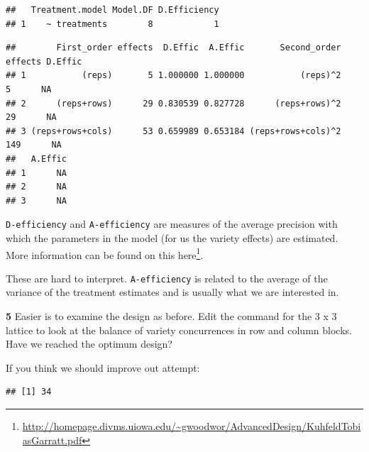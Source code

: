 \documentclass[
]{book}
\makeatletter
\newenvironment{Shaded}{\begin{snugshade}}{\end{snugshade}}
\newcommand{\FloatTok}[1]{\textcolor[rgb]{0.00,0.00,0.81}{#1}}
\newcommand{\NormalTok}[1]{#1}
\newcommand{\SpecialCharTok}[1]{\textcolor[rgb]{0.00,0.00,0.00}{#1}}
\renewcommand{\href}[2]{#2\footnote{\url{#1}}}
\newenvironment{kframe}{%
\medskip{}
\setlength{\fboxsep}{.8em}
 \def\at@end@of@kframe{}%
 \ifinner\ifhmode%
  \def\at@end@of@kframe{\end{minipage}}%
  \begin{minipage}{\columnwidth}%
 \fi\fi%
 \def\FrameCommand##1{\hskip\@totalleftmargin \hskip-\fboxsep
 \colorbox{shadecolor}{##1}\hskip-\fboxsep
     \hskip-\linewidth \hskip-\@totalleftmargin \hskip\columnwidth}%
 \MakeFramed {\advance\hsize-\width
   \@totalleftmargin\z@ \linewidth\hsize
   \@setminipage}}%
 {\par\unskip\endMakeFramed%
 \at@end@of@kframe}
\newenvironment{rmdblock}[1]
  {
  \begin{itemize}
  \renewcommand{\labelitemi}{
    \raisebox{-.7\height}[0pt][0pt]{
      {\setkeys{Gin}{width=3em,keepaspectratio}\texttt{[image: images/\#1]}}
    }
  }
  \setlength{\fboxsep}{1em}
  \begin{kframe}
  \item
  }
  {
  \end{kframe}
  \end{itemize}
  }
\newenvironment{rmdquiz}
  {\begin{rmdblock}{quiz}}
  {\end{rmdblock}}
\makeatother
\begin{document}
\begin{verbatim}
##   Treatment.model Model.DF D.Efficiency
## 1    ~ treatments        8            1
\end{verbatim}

\begin{Shaded}
\end{Shaded}

\begin{verbatim}
##        First_order effects  D.Effic  A.Effic       Second_order effects D.Effic
## 1           (reps)       5 1.000000 1.000000           (reps)^2       5      NA
## 2      (reps+rows)      29 0.830539 0.827728      (reps+rows)^2      29      NA
## 3 (reps+rows+cols)      53 0.659989 0.653184 (reps+rows+cols)^2     149      NA
##   A.Effic
## 1      NA
## 2      NA
## 3      NA
\end{verbatim}

\texttt{D-efficiency} and \texttt{A-efficiency} are measures of the average precision with which the parameters in the model (for us the variety effects) are estimated. More information can be found on this \href{http://homepage.divms.uiowa.edu/~gwoodwor/AdvancedDesign/KuhfeldTobiasGarratt.pdf}{here}.

These are hard to interpret. \texttt{A-efficiency} is related to the average of the variance of the treatment estimates and is usually what we are interested in.

\begin{rmdquiz}
\textbf{5} Easier is to examine the design as before. Edit the command for the 3 x 3 lattice to look at the balance of variety concurrences in row and column blocks. Have we reached the optimum design?
\end{rmdquiz}

If you think we should improve out attempt:

\begin{Shaded}
\end{Shaded}

\begin{verbatim}
## [1] 34
\end{verbatim}
\end{document}

